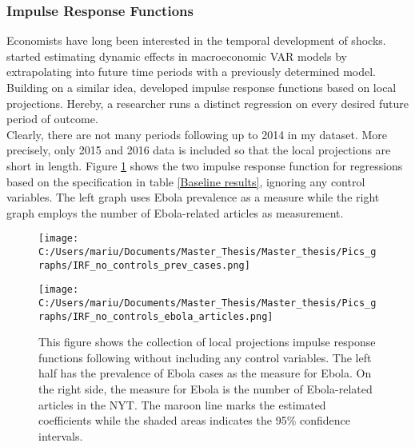 \documentclass{article}
\begin{document}
\subsubsection{Impulse Response Functions}

Economists have long been interested in the temporal development of shocks. \cite{blanchard1988dynamic} started estimating dynamic effects in
macroeconomic VAR models by extrapolating into future time periods with a previously determined model. Building on a similar idea, \cite{jorda2005estimation} developed impulse response functions based on local projections. Hereby, a researcher runs a distinct regression on every desired future period of outcome. \\
Clearly, there are not many periods following up to 2014 in my dataset. More precisely, only 2015 and 2016 data is included so that the local projections are short in length. Figure \ref{First Stage IRF - no controls} shows the two impulse response function for regressions based on the specification in table \ref{Baseline results}, ignoring any control variables. The left graph uses Ebola prevalence as a measure while the right graph employs the number of Ebola-related articles as measurement.

\begin{figure}[!ht] 
\begin{minipage}[t]{0.5\linewidth}\vspace{0pt} 
\texttt{[image: C:/Users/mariu/Documents/Master\_Thesis/Master\_thesis/Pics\_graphs/IRF\_no\_controls\_prev\_cases.png]}\\
\end{minipage}\hfill%
\begin{minipage}[t]{0.5\linewidth}\vspace{0pt} 
\texttt{[image: C:/Users/mariu/Documents/Master\_Thesis/Master\_thesis/Pics\_graphs/IRF\_no\_controls\_ebola\_articles.png]}\\
\end{minipage}\hfill%
\caption{This figure shows the collection of local projections impulse response functions following \cite{jorda2005estimation} without including any control variables. The left half has the prevalence of Ebola cases as the measure for Ebola. On the right side, the measure for Ebola is the number of Ebola-related articles in the NYT. The maroon line marks the estimated coefficients while the shaded areas indicates the 95\% confidence intervals.}
\label{First Stage IRF - no controls}
\end{figure}
\end{document}
